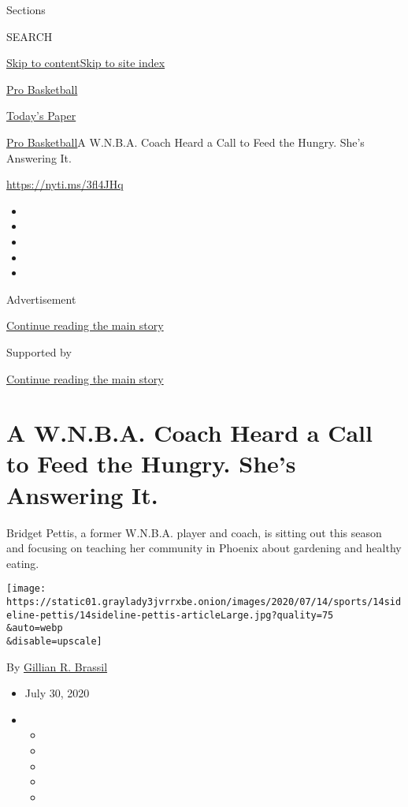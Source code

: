 Sections

SEARCH

\protect\hyperlink{site-content}{Skip to
content}\protect\hyperlink{site-index}{Skip to site index}

\href{https://www.nytimes3xbfgragh.onion/section/sports/basketball}{Pro
Basketball}

\href{https://myaccount.nytimes3xbfgragh.onion/auth/login?response_type=cookie\&client_id=vi}{}

\href{https://www.nytimes3xbfgragh.onion/section/todayspaper}{Today's
Paper}

\href{/section/sports/basketball}{Pro Basketball}\textbar{}A W.N.B.A.
Coach Heard a Call to Feed the Hungry. She's Answering It.

\url{https://nyti.ms/3fl4JHq}

\begin{itemize}
\item
\item
\item
\item
\item
\end{itemize}

Advertisement

\protect\hyperlink{after-top}{Continue reading the main story}

Supported by

\protect\hyperlink{after-sponsor}{Continue reading the main story}

\hypertarget{a-wnba-coach-heard-a-call-to-feed-the-hungry-shes-answering-it}{%
\section{A W.N.B.A. Coach Heard a Call to Feed the Hungry. She's
Answering
It.}\label{a-wnba-coach-heard-a-call-to-feed-the-hungry-shes-answering-it}}

Bridget Pettis, a former W.N.B.A. player and coach, is sitting out this
season and focusing on teaching her community in Phoenix about gardening
and healthy eating.

\texttt{[image: https://static01.graylady3jvrrxbe.onion/images/2020/07/14/sports/14sideline-pettis/14sideline-pettis-articleLarge.jpg?quality=75\\\&auto=webp\\\&disable=upscale]}

By
\href{https://www.nytimes3xbfgragh.onion/by/gillian-r--brassil}{Gillian
R. Brassil}

\begin{itemize}
\item
  July 30, 2020
\item
  \begin{itemize}
  \item
  \item
  \item
  \item
  \item
  \end{itemize}
\end{itemize}

